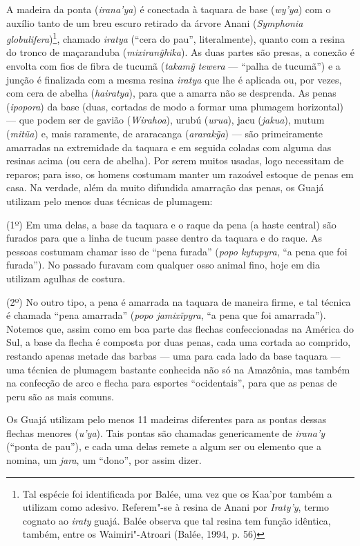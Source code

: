 A madeira da ponta (\emph{irana'ya}) é conectada à taquara de base
(\emph{wy'ya}) com o auxílio tanto de um breu escuro retirado da árvore
Anani (\emph{Symphonia globulifera})\footnote{Tal espécie foi
  identificada por Balée, uma vez que os Kaa'por também a utilizam como
  adesivo. Referem"-se à resina de Anani por \emph{Iraty'y}, termo
  cognato ao \emph{iraty} guajá. Balée observa que tal resina tem função
  idêntica, também, entre os Waimiri"-Atroari (Balée, 1994, p. 56)}, chamado
\emph{iratya} (``cera do pau'', literalmente), quanto com a resina do
tronco de maçaranduba (\emph{mixiranỹhika}). As duas partes são presas,
a conexão é envolta com fios de fibra de tucumã (\emph{takamỹ}
\emph{tewera} --- ``palha de tucumã'') e a junção é finalizada com a mesma
resina \emph{iratya} que lhe é aplicada ou, por vezes, com cera de
abelha (\emph{hairatya}), para que a amarra não se desprenda. As penas
(\emph{ipopora}) da base (duas, cortadas de modo a formar uma plumagem
horizontal) --- que podem ser de gavião (\emph{Wirahoa}), urubú
(\emph{urua}), jacu (\emph{jakua}), mutum (\emph{mitũa}) e, mais
raramente, de araracanga (\emph{ararakỹa}) --- são primeiramente amarradas
na extremidade da taquara e em seguida coladas com alguma das resinas
acima (ou cera de abelha). Por serem muitos usadas, logo necessitam de
reparos; para isso, os homens costumam manter um razoável estoque de
penas em casa. Na verdade, além da muito difundida amarração das penas,
os Guajá utilizam pelo menos duas técnicas de plumagem:

(1º) Em uma delas, a base da taquara e o raque da pena (a haste central)
são furados para que a linha de tucum passe dentro da taquara e do
raque. As pessoas costumam chamar isso de ``pena furada'' (\emph{popo
kytupyra}, ``a pena que foi furada''). No passado furavam com qualquer
osso animal fino, hoje em dia utilizam agulhas de costura.

(2º) No outro tipo, a pena é amarrada na taquara de maneira firme, e tal
técnica é chamada ``pena amarrada'' (\emph{popo jamixĩpyra}, ``a pena
que foi amarrada''). Notemos que, assim como em boa parte das flechas
confeccionadas na América do Sul, a base da flecha é composta por duas
penas, cada uma cortada ao comprido, restando apenas metade das barbas ---
uma para cada lado da base taquara --- uma técnica de plumagem bastante
conhecida não só na Amazônia, mas também na confecção de arco e flecha
para esportes ``ocidentais'', para que as penas de peru são as mais
comuns.


Os Guajá utilizam pelo menos 11 madeiras diferentes para as pontas
dessas flechas menores (\emph{u'ya}). Tais pontas são chamadas
genericamente de \emph{irana'y} (``ponta de pau''), e cada uma delas
remete a algum ser ou elemento que a nomina, um \emph{jara}, um
``dono'', por assim dizer.

